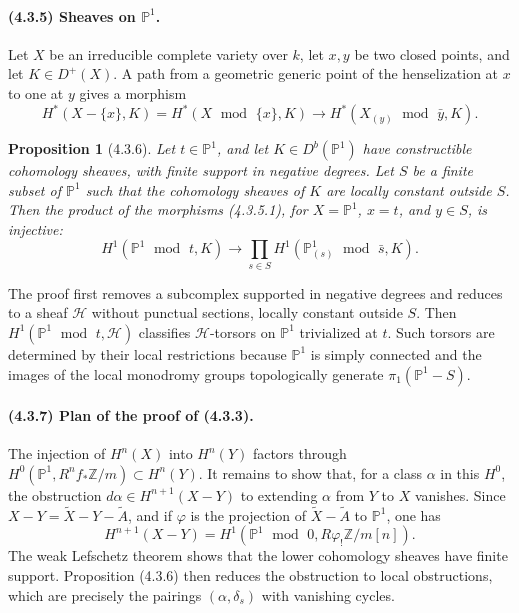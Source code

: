 \documentclass[11pt]{article}
\newtheorem{proposition}{Proposition}
\theoremstyle{remark}
\begin{document}
\paragraph{(4.3.5) Sheaves on $\mathbb P^1$.}
Let $X$ be an irreducible complete variety over $k$, let $x,y$ be two closed points, and let $K\in D^+(X)$. A path from a geometric generic point of the henselization at $x$ to one at $y$ gives a morphism
\[
H^*(X-\{x\},K)=H^*(X\operatorname{\ mod\ }\{x\},K)\to H^*(X_{(y)}\operatorname{\ mod\ }\bar y,K).
\tag{4.3.5.1}
\]

\begin{proposition}[4.3.6]
Let $t\in\mathbb P^1$, and let $K\in D^b(\mathbb P^1)$ have constructible cohomology sheaves, with finite support in negative degrees. Let $S$ be a finite subset of $\mathbb P^1$ such that the cohomology sheaves of $K$ are locally constant outside $S$. Then the product of the morphisms (4.3.5.1), for $X=\mathbb P^1$, $x=t$, and $y\in S$, is injective:
\[
H^1(\mathbb P^1\operatorname{\ mod\ }t,K)\to
\prod_{s\in S}H^1(\mathbb P^1_{(s)}\operatorname{\ mod\ }\bar s,K).
\]
\end{proposition}

The proof first removes a subcomplex supported in negative degrees and reduces to a sheaf $\mathcal H$ without punctual sections, locally constant outside $S$. Then $H^1(\mathbb P^1\operatorname{\ mod\ }t,\mathcal H)$ classifies $\mathcal H$-torsors on $\mathbb P^1$ trivialized at $t$. Such torsors are determined by their local restrictions because $\mathbb P^1$ is simply connected and the images of the local monodromy groups topologically generate $\pi_1(\mathbb P^1-S)$.

\paragraph{(4.3.7) Plan of the proof of (4.3.3).}
The injection of $H^n(X)$ into $H^n(Y)$ factors through $H^0(\mathbb P^1,R^n f_*\mathbb Z/m)\subset H^n(Y)$. It remains to show that, for a class $\alpha$ in this $H^0$, the obstruction $d\alpha\in H^{n+1}(X-Y)$ to extending $\alpha$ from $Y$ to $X$ vanishes. Since $X-Y=\widetilde X-Y-\widetilde A$, and if $\varphi$ is the projection of $\widetilde X-\widetilde A$ to $\mathbb P^1$, one has
\[
H^{n+1}(X-Y)=H^1(\mathbb P^1\operatorname{\ mod\ }0,R\varphi_!\mathbb Z/m[n]).
\]
The weak Lefschetz theorem shows that the lower cohomology sheaves have finite support. Proposition (4.3.6) then reduces the obstruction to local obstructions, which are precisely the pairings $(\alpha,\delta_s)$ with vanishing cycles.
\end{document}
